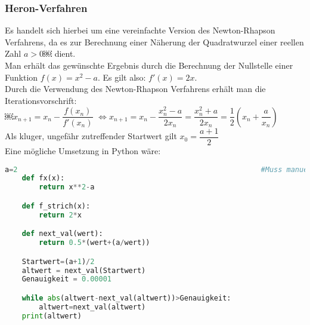 \documentclass[main.tex]{subfiles}
\begin{document}
\subsubsection{Heron-Verfahren}
Es handelt sich hierbei um eine vereinfachte Version des Newton-Rhapson Verfahrens, da es zur Berechnung einer Näherung der Quadratwurzel einer reellen Zahl $a>0$￼ dient.\\
Man erhält das gewünschte Ergebnis durch die Berechnung der Nullstelle einer Funktion $f(x)=x^{2}-a$. Es gilt also: $f'(x)=2x$.\\
Durch die Verwendung des Newton-Rhapson Verfahrens erhält man die Iterationsvorschrift:\\
￼$x_{n+1}=x_{n}-\dfrac{f(x_{n})}{f'(x_{n})}$
$\Leftrightarrow x_{n+1}=x_{n}-\dfrac{x_{n}^{2}-a}{2x_{n}}=\dfrac{x_{n}^{2}+a}{2x_{n}}=\dfrac{1}{2}\left(x_{n}+\dfrac{a}{x_{n}}\right)$\\
Als kluger, ungefähr zutreffender Startwert gilt $x_0=\dfrac{a+1}{2}$\\
Eine mögliche Umsetzung in Python wäre:\\


\begin{lstlisting}[language=Python]
	a=2															#Muss manuell angegeben werden
	def fx(x):
		return x**2-a

	def f_strich(x):
		return 2*x

	def next_val(wert):
		return 0.5*(wert+(a/wert))

	Startwert=(a+1)/2
	altwert = next_val(Startwert)
	Genauigkeit = 0.00001

	while abs(altwert-next_val(altwert))>Genauigkeit:
		altwert=next_val(altwert)
	print(altwert)
\end{lstlisting}
\end{document}
